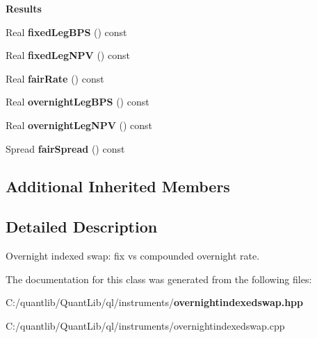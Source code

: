\begin{Indent}{\bf Results}\par
\begin{DoxyCompactItemize}
\item 
Real {\bfseries fixed\+Leg\+B\+PS} () const \label{class_quant_lib_1_1_overnight_indexed_swap_a0cf66be155db62c91ad9d7c153e4c9d3}

\item 
Real {\bfseries fixed\+Leg\+N\+PV} () const \label{class_quant_lib_1_1_overnight_indexed_swap_aca47c73e0be2e44c2fd6d10b96d17a41}

\item 
Real {\bfseries fair\+Rate} () const \label{class_quant_lib_1_1_overnight_indexed_swap_a3c44f465b35a55a3a1df474359d9ce4c}

\item 
Real {\bfseries overnight\+Leg\+B\+PS} () const \label{class_quant_lib_1_1_overnight_indexed_swap_a6b6ae87240d4d751a259614530eb5eb2}

\item 
Real {\bfseries overnight\+Leg\+N\+PV} () const \label{class_quant_lib_1_1_overnight_indexed_swap_ad29f8bb5429bc128b15a5159d056ae56}

\item 
Spread {\bfseries fair\+Spread} () const \label{class_quant_lib_1_1_overnight_indexed_swap_a8e41371de588561f04781df9662413d5}

\end{DoxyCompactItemize}
\end{Indent}
\subsection*{Additional Inherited Members}


\subsection{Detailed Description}
Overnight indexed swap\+: fix vs compounded overnight rate. 

The documentation for this class was generated from the following files\+:\begin{DoxyCompactItemize}
\item 
C\+:/quantlib/\+Quant\+Lib/ql/instruments/{\bf overnightindexedswap.\+hpp}\item 
C\+:/quantlib/\+Quant\+Lib/ql/instruments/overnightindexedswap.\+cpp\end{DoxyCompactItemize}
